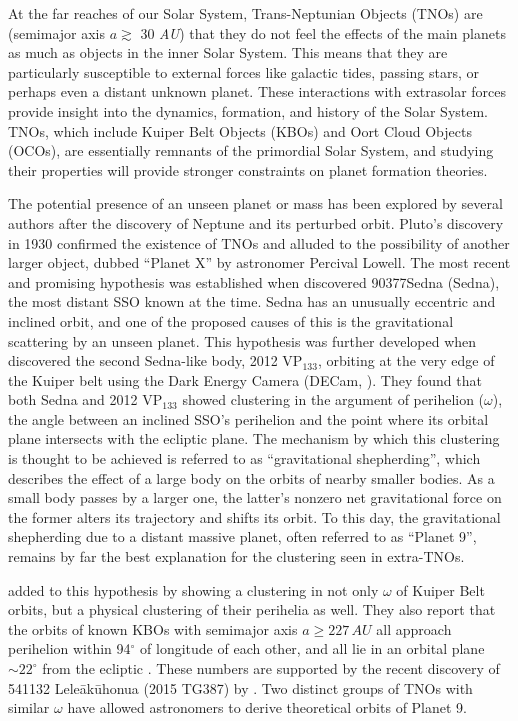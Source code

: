 \documentclass[twocolumn]{aastex62}
\begin{document}
At the far reaches of our Solar System, Trans-Neptunian Objects (TNOs) are  (semimajor axis $a\gtrsim$ 30 \textit{AU}) that they do not feel the effects of the main planets as much as objects in the inner Solar System.  This means that they are particularly susceptible to external forces like galactic tides, passing stars, or perhaps even a distant unknown planet.  These interactions with extrasolar forces provide insight into the dynamics, formation, and history of the Solar System.  TNOs, which include Kuiper Belt Objects (KBOs) and Oort Cloud Objects (OCOs), are essentially remnants of the primordial Solar System, and studying their properties will provide stronger constraints on planet formation theories.

The potential presence of an unseen planet or mass has been explored by several authors after the discovery of Neptune and its perturbed orbit.  Pluto's discovery in 1930 confirmed the existence of TNOs and alluded to the possibility of another larger object, dubbed ``Planet X'' by astronomer Percival Lowell.  The most recent and promising hypothesis was established when \cite{Brown04} discovered 90377Sedna (Sedna), the most distant SSO known at the time.  Sedna has an unusually eccentric and inclined orbit, and one of the proposed causes of this is the gravitational scattering by an unseen planet.  
This hypothesis was further developed when \cite{Trujillo14} discovered the second Sedna-like body, 2012 VP$_{133}$, orbiting at the very edge of the Kuiper belt using the Dark Energy Camera (DECam, \citealt{flaugher}).  They found that both Sedna and 2012 VP$_{133}$ showed clustering in the argument of perihelion ($\omega$), the angle between an inclined SSO's perihelion and the point where its orbital plane intersects with the ecliptic plane.  The mechanism by which this clustering is thought to be achieved is referred to as ``gravitational shepherding'', which describes the effect of a large body on the orbits of nearby smaller bodies.  As a small body passes by a larger one, the latter’s nonzero net gravitational force on the former alters its trajectory and shifts its orbit.  To this day, the gravitational shepherding due to a distant massive planet, often referred to as ``Planet 9'', remains by far the best explanation for the clustering seen in extra-TNOs.

\cite{batygin16} added to this hypothesis by showing a clustering in not only $\omega$ of Kuiper Belt orbits, but a physical clustering of their perihelia as well.  They also report that the orbits of known KBOs with semimajor axis $a\geq227\,AU$  all approach perihelion within 94$^{\circ}$ of longitude of each other, and all lie in an orbital plane $\sim22^{\circ}$ from the ecliptic \citep{brown16}.  These numbers are supported by the recent discovery of 541132 Lele\={a}k\={u}honua (2015 TG387) by \cite{shep19}.  Two distinct groups of TNOs with similar $\omega$ have allowed astronomers to derive theoretical orbits of Planet 9.
\end{document}
